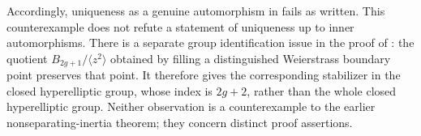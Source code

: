 Accordingly, uniqueness as a genuine automorphism in
\cite[Lemma 6.16]{Boggi} fails as written. This counterexample does
not refute a statement of uniqueness up to inner automorphisms.
There is a separate group identification issue in the proof of
\cite[Proposition 6.9]{Boggi}: the quotient
$B_{2g+1}/\langle z^2\rangle$ obtained by filling a distinguished
Weierstrass boundary point preserves that point. It therefore gives
the corresponding stabilizer in the closed hyperelliptic group,
whose index is $2g+2$, rather than the whole closed hyperelliptic
group. Neither observation is a counterexample to the earlier
nonseparating-inertia theorem; they concern distinct proof assertions.
